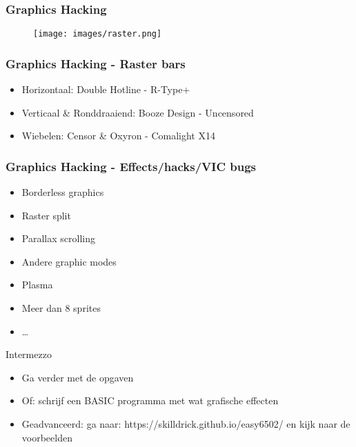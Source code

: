 
\begin{frame}
\frametitle{Graphics Hacking}

\begin{figure}
\texttt{[image: images/raster.png]}
\end{figure}

\end{frame}


\begin{frame}
\frametitle{Graphics Hacking - Raster bars}

\begin{itemize}
\item Horizontaal: Double Hotline - R-Type+
\item Verticaal \& Ronddraaiend: Booze Design - Uncensored
\item Wiebelen: Censor \& Oxyron - Comalight X14
\end{itemize}

\end{frame}


\begin{frame}
\frametitle{Graphics Hacking - Effects/hacks/VIC bugs}

\begin{itemize}
\item Borderless graphics
\item Raster split
\item Parallax scrolling
\item Andere graphic modes
\item Plasma
\item Meer dan 8 sprites
\item \dots
\end{itemize}

\end{frame}


\begin{frame}{Intermezzo}

\begin{itemize}
\item Ga verder met de opgaven
\item Of: schrijf een BASIC programma met wat grafische effecten
\item Geadvanceerd: ga naar: https://skilldrick.github.io/easy6502/ en kijk naar
de voorbeelden
\end{itemize}

\end{frame}
